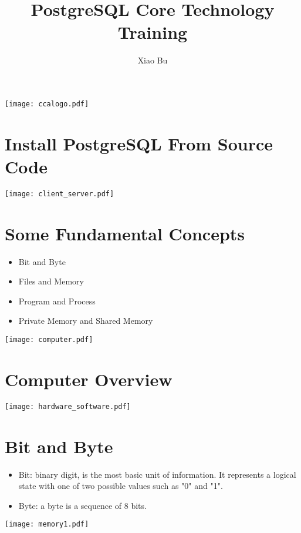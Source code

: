\documentclass[en,hazy,blue,screen,14pt]{elegantnote}
\title{PostgreSQL Core Technology Training}
\author{Xiao Bu}
\institute{https://cherry-creek.net}
\begin{document}
\maketitle
\centerline{\texttt{[image: ccalogo.pdf]}}


\newpage
\section{Install PostgreSQL From Source Code}
\centerline{\texttt{[image: client\_server.pdf]}}


\newpage
\section{Some Fundamental Concepts}
\begin{itemize}
	\item Bit and Byte
	\item Files and Memory
	\item Program and Process
	\item Private Memory and Shared Memory
\end{itemize}

\centerline{\texttt{[image: computer.pdf]}}

\newpage
\section{Computer Overview}
\centerline{\texttt{[image: hardware\_software.pdf]}}

\newpage
\section{Bit and Byte}
\begin{itemize}
	\item Bit: binary digit, is the most basic unit of information. It represents a logical state with one of two possible values such as "0" and "1".
	\item Byte: a byte is a sequence of 8 bits.
\end{itemize}
\centerline{\texttt{[image: memory1.pdf]}}
\end{document}
